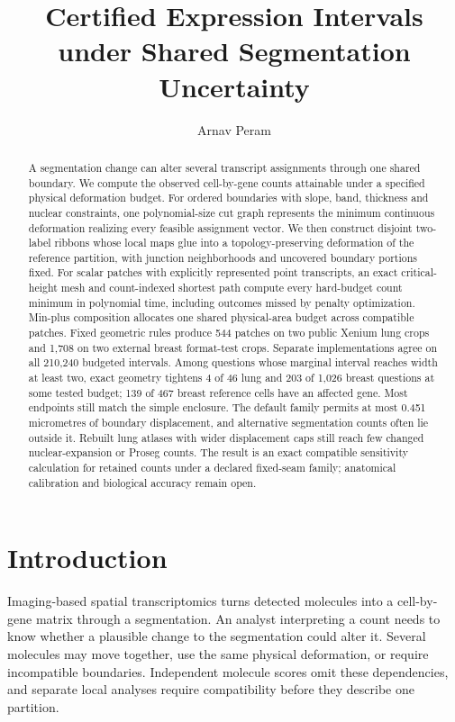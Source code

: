 \documentclass[10pt,letterpaper]{article}
\title{Certified Expression Intervals under Shared Segmentation Uncertainty}
\author{Arnav Peram}
\date{}
\begin{document}
\begin{titlepage}\maketitle\thispagestyle{empty}
\begin{abstract}\normalsize
A segmentation change can alter several transcript assignments through one shared boundary. We compute the observed cell-by-gene counts attainable under a specified physical deformation budget. For ordered boundaries with slope, band, thickness and nuclear constraints, one polynomial-size cut graph represents the minimum continuous deformation realizing every feasible assignment vector. We then construct disjoint two-label ribbons whose local maps glue into a topology-preserving deformation of the reference partition, with junction neighborhoods and uncovered boundary portions fixed. For scalar patches with explicitly represented point transcripts, an exact critical-height mesh and count-indexed shortest path compute every hard-budget count minimum in polynomial time, including outcomes missed by penalty optimization. Min-plus composition allocates one shared physical-area budget across compatible patches. Fixed geometric rules produce 544 patches on two public Xenium lung crops and 1,708 on two external breast format-test crops. Separate implementations agree on all 210,240 budgeted intervals. Among questions whose marginal interval reaches width at least two, exact geometry tightens 4 of 46 lung and 203 of 1,026 breast questions at some tested budget; 139 of 467 breast reference cells have an affected gene. Most endpoints still match the simple enclosure. The default family permits at most 0.451 micrometres of boundary displacement, and alternative segmentation counts often lie outside it. Rebuilt lung atlases with wider displacement caps still reach few changed nuclear-expansion or Proseg counts. The result is an exact compatible sensitivity calculation for retained counts under a declared fixed-seam family; anatomical calibration and biological accuracy remain open.
\end{abstract}
\thispagestyle{empty}\end{titlepage}
\hypersetup{pageanchor=true}\setcounter{page}{1}

\section{Introduction}
Imaging-based spatial transcriptomics turns detected molecules into a cell-by-gene matrix through a segmentation. An analyst interpreting a count needs to know whether a plausible change to the segmentation could alter it. Several molecules may move together, use the same physical deformation, or require incompatible boundaries. Independent molecule scores omit these dependencies, and separate local analyses require compatibility before they describe one partition.
\end{document}
